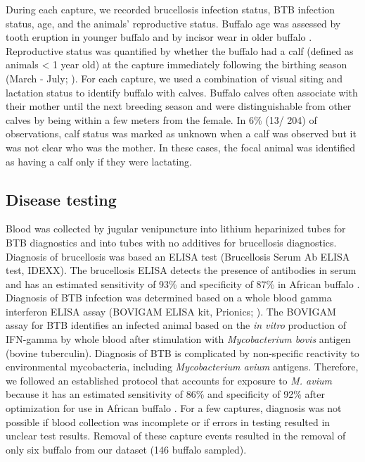 \documentclass[11pt]{article}
\begin{document}
During each capture, we recorded brucellosis infection status, BTB infection status, age, and the animals' reproductive status. Buffalo age was assessed by tooth eruption in younger buffalo and by incisor wear in older buffalo \cite{jolles_population_2007}. Reproductive status was quantified by whether the buffalo had a calf (defined as animals < 1 year old) at the capture immediately following the birthing season (March - July; \cite{gorsich_context-dependent_2015}). For each capture, we used a combination of visual siting and lactation status to identify buffalo with calves. Buffalo calves often associate with their mother until the next breeding season and were distinguishable from other calves by being within a few meters from the female. In 6\% (13/ 204) of observations, calf status was marked as unknown when a calf was observed but it was not clear who was the mother. In these cases, the focal animal was identified as having a calf only if they were lactating. \\

\subsection*{Disease testing}
Blood was collected by jugular venipuncture into lithium heparinized tubes for BTB diagnostics and into tubes with no additives for brucellosis diagnostics. Diagnosis of brucellosis was based an ELISA test (Brucellosis Serum Ab ELISA test, IDEXX). The brucellosis ELISA detects the presence of antibodies in serum and has an estimated sensitivity of 93\% and specificity of 87\% in African buffalo \cite{gorsich_evaluation_2015}. Diagnosis of BTB infection was determined based on a whole blood gamma interferon ELISA assay (BOVIGAM ELISA kit, Prionics; \cite{michel_approaches_2011}). The BOVIGAM assay for BTB identifies an infected animal based on the \textit{in vitro} production of IFN-gamma by whole blood after stimulation with \textit{Mycobacterium bovis} antigen (bovine tuberculin). Diagnosis of BTB is complicated by non-specific reactivity to environmental mycobacteria, including \textit{Mycobacterium avium} antigens. Therefore, we followed an established protocol that accounts for exposure to \textit{M. avium} because it has an estimated sensitivity of 86\% and specificity of 92\% after optimization for use in African buffalo \cite{michel_approaches_2011}. For a few captures, diagnosis was not possible if blood collection was incomplete or if errors in testing resulted in unclear test results. Removal of these capture events resulted in the removal of only six buffalo from our dataset (146 buffalo sampled).
\end{document}
